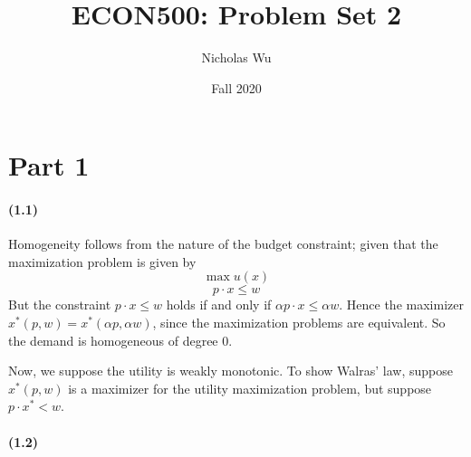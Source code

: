 \documentclass[10pt,letter]{article}
\begin{document}


\title{ECON500: Problem Set 2}

\author{Nicholas Wu}

\date{Fall 2020}

\maketitle


\section*{Part 1}

\paragraph{(1.1)}
Homogeneity follows from the nature of the budget constraint; given that the maximization problem is given by
\[ \max u(x) \]
\[ p \cdot x \le w \]
But the constraint $p \cdot x \le w$ holds if and only if $\alpha p \cdot x \le \alpha w$. Hence the maximizer $x^*(p,w) = x^*(\alpha p, \alpha w)$, since the maximization problems are equivalent. So the demand is homogeneous of degree 0.

Now, we suppose the utility is weakly monotonic.
To show Walras' law, suppose $x^*(p,w)$ is a maximizer for the utility maximization problem, but suppose $p\cdot x^* < w$.
\paragraph{(1.2)}
\end{document}
